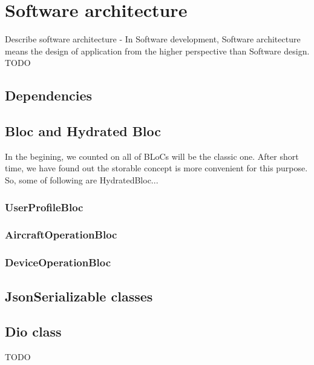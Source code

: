 \chapter{Software architecture}\label{ch:software-architecture}
Describe software architecture - In Software development, Software architecture means the design of application from the higher perspective than Software design.
TODO
\section{Dependencies}\label{sec:dependencies}

\section{Bloc and Hydrated Bloc}\label{sec:bloc-and-hydrated-bloc}
In the begining, we counted on all of BLoCs will be the classic one.
After short time, we have found out the storable concept is more convenient for this purpose.
So, some of following are HydratedBloc...

\subsection{UserProfileBloc}\label{subsec:userprofilebloc}

\subsection{AircraftOperationBloc}\label{subsec:aircraftoperationbloc}

\subsection{DeviceOperationBloc}\label{subsec:deviceoperationbloc}


\section{JsonSerializable classes}\label{sec:jsonserializable-classes}

\section{Dio class}\label{sec:dio-class}

TODO